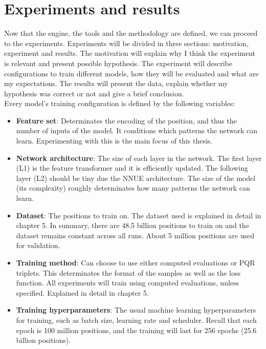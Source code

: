 \newcommand{\depiction}[1]{\parbox{0.7cm}{\texttt{[image: ../assets/depictions/\#1.pdf]}}}
\newcommand{\depictionSM}[1]{\parbox{0.6cm}{\texttt{[image: ../assets/depictions/\#1.pdf]}}}


\section{Experiments and results}

Now that the engine, the tools and the methodology are defined, we can proceed to the experiments. Experiments will be divided in three sections: motivation, experiment and results. The motivation will explain why I think the experiment is relevant and present possible hypothesis. The experiment will describe configurations to train different models, how they will be evaluated and what are my expectations. The results will present the data, explain whether my hypothesis was correct or not and give a brief conclusion. \\

Every model's training configuration is defined by the following variables:

\begin{itemize}
\item \textbf{Feature set}: Determinates the encoding of the position, and thus the number of inputs of the model. It conditions which patterns the network can learn. Experimenting with this is the main focus of this thesis.

\item \textbf{Network architecture}: The size of each layer in the network. The first layer (L1) is the feature transformer and it is efficiently updated. The following layer (L2) should be tiny due the NNUE architecture. The size of the model (its complexity) roughly determinates how many patterns the network can learn.

\item \textbf{Dataset}: The positions to train on. The dataset used is explained in detail in chapter 5. In summary, there are 48.5 billion positions to train on and the dataset remains constant across all runs. About 5 million positions are used for validation.

\item \textbf{Training method}: Can choose to use either computed evaluations or PQR triplets. This determinates the format of the samples as well as the loss function. All experiments will train using computed evaluations, unless specified. Explained in detail in chapter 5.

\item \textbf{Training hyperparameters}: The usual machine learning hyperparameters for training, such as batch size, learning rate and scheduler. Recall that each epoch is 100 million positions, and the training will last for 256 epochs (25.6 billion positions).
\end{itemize}

